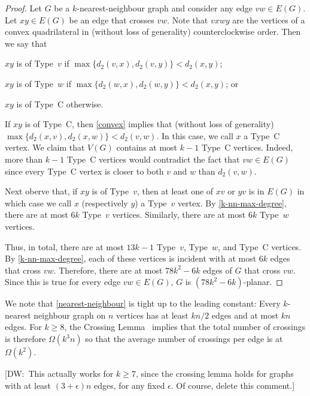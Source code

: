 \documentclass{patmorin}
\newcommand{\note}[2]{{\color{red}[#1:~#2]}}
\renewcommand{\ge}{\geqslant}
\renewcommand{\geq}{\geqslant}
\begin{document}
\begin{proof}
  Let $G$ be a $k$-nearest-neighbour graph and consider any edge $vw\in E(G)$.
  Let $xy\in E(G)$ be an edge that crosses $vw$.  Note that $vxwy$ are the vertices of a convex quadrilateral in (without loss of generality) counterclockwise order. Then we say that 
  \begin{compactenum}
    \item $xy$ is of Type~$v$ if $\max\{d_2(v,x), d_2(v,y)\}< d_2(x,y)$;
    \item $xy$ is of Type~$w$ if $\max\{d_2(w,x), d_2(w,y)\}< d_2(x,y)$; or
    \item $xy$ is of Type~C otherwise.
  \end{compactenum}
  If $xy$ is of Type~C, then \cref{convex} implies that (without loss of generality) $\max\{d_2(x,v),d_2(x,w)\} < d_2(v,w)$.  In this case, we call $x$ a Type~C vertex.  We claim that $V(G)$ contains at most $k-1$ Type~C vertices.  Indeed, more than $k-1$ Type~C vertices would contradict the fact that $vw\in E(G)$ since every Type~C vertex is closer to both $v$ and $w$ than $d_2(v,w)$.
  
  Next oberve that, if $xy$ is of Type~$v$, then at least one of $xv$ or $yv$ is in $E(G)$ in which case we call $x$ (respectively $y$) a Type~$v$ vertex.  By \cref{k-nn-max-degree}, there are at most $6k$ Type~$v$ vertices.  Similarly, there are at most $6k$ Type~$w$ vertices.
  
  Thus, in total, there are at most $13k-1$ Type~$v$, Type~$w$, and Type~C vertices. By \cref{k-nn-max-degree}, each of these vertices is incident with at most $6k$ edges that cross $vw$. Therefore, there are at most $78k^2-6k$ edges of $G$ that cross $vw$.  Since this is true for every edge $vw\in E(G)$, $G$ is $(78k^2-6k)$-planar.
\end{proof}

We note that \cref{nearest-neighbour} is tight up to the leading constant:  Every $k$-nearest neighbour graph on $n$ vertices has at least $kn/2$ edges and at most $kn$ edges.  For $k\ge 8$, the Crossing Lemma~\citep{ajtai.chvatal.ea:crossing-free,leighton:complexity} implies that the total number of crossings is therefore $\Omega(k^3n)$ so that the average number of crossings per edge is at $\Omega(k^2)$.

\note{DW}{This actually works for $k\geq 7$, since the crossing lemma holds for graphs with at least $(3+\epsilon)n$ edges, for any fixed $\epsilon$. Of course, delete this comment.}
\end{document}
